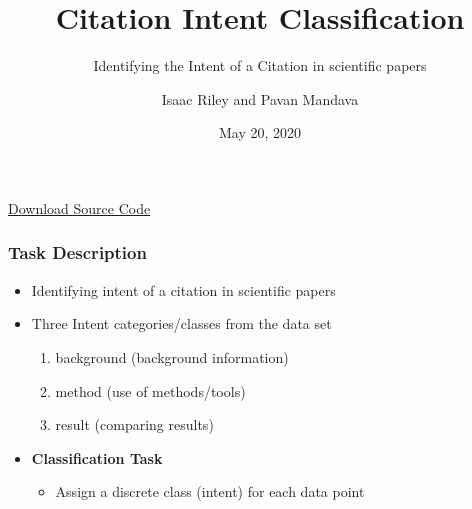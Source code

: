\documentclass[
  xcolor={svgnames},
  hyperref={colorlinks,citecolor=DeepPink4,linkcolor=DarkRed,urlcolor=DarkBlue}
  ]{beamer}
\title[] %
{Citation Intent Classification}
\subtitle{Identifying the Intent of a Citation in scientific papers}
\author[tmip, hieutt] %
{Isaac Riley and Pavan Mandava}
\institute[Universities Here and There] %
{
  \inst{1}%
  Computational Linguistics, M.Sc.\\
  \and
  \inst{2}%
  Computational Linguistics, M.Sc.\\
}
\date[] %
{May 20, 2020}
\begin{document}
\begin{frame}
\titlepage
\centering
\href{https://drive.google.com/u/0/uc?id=1eO_M2X5YSs_uAGQ2XdiylV7QbEVfjCKV&export=download}{Download Source Code}
\end{frame}


\begin{frame}
\frametitle{Task Description}

\begin{itemize}

\item Identifying intent of a citation in scientific papers
\bigskip
\item Three Intent categories/classes from the data set
	\begin{enumerate}
		\item background (background information)
		\item method (use of methods/tools)
		\item result (comparing results)
	\end{enumerate}
\bigskip
\item {\bf Classification Task }
	\begin{itemize}
		\item Assign a discrete class (intent) for each data point
	\end{itemize}
\end{itemize}

\end{frame}
\end{document}
